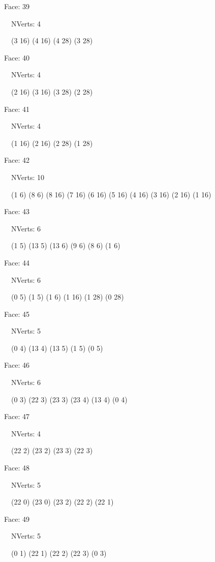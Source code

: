 \documentclass{article}
\begin{document}
{\footnotesize 

Face: 39

\   \    NVerts: 4

 \   \   (3 16) (4 16) (4 28) (3 28)}

{\footnotesize 

Face: 40

\   \    NVerts: 4

 \   \   (2 16) (3 16) (3 28) (2 28)}

{\footnotesize 

Face: 41

\   \    NVerts: 4

 \   \   (1 16) (2 16) (2 28) (1 28)}

{\footnotesize 

Face: 42

\   \    NVerts: 10

 \   \   (1 6) (8 6) (8 16) (7 16) (6 16) (5 16) (4 16) (3 16) (2 16) (1 16)}

{\footnotesize 

Face: 43

\   \    NVerts: 6

 \   \   (1 5) (13 5) (13 6) (9 6) (8 6) (1 6)}

{\footnotesize 

Face: 44

\   \    NVerts: 6

 \   \   (0 5) (1 5) (1 6) (1 16) (1 28) (0 28)}

{\footnotesize 

Face: 45

\   \    NVerts: 5

 \   \   (0 4) (13 4) (13 5) (1 5) (0 5)}

{\footnotesize 

Face: 46

\   \    NVerts: 6

 \   \   (0 3) (22 3) (23 3) (23 4) (13 4) (0 4)}

{\footnotesize 

Face: 47

\   \    NVerts: 4

 \   \   (22 2) (23 2) (23 3) (22 3)}

{\footnotesize 

Face: 48

\   \    NVerts: 5

 \   \   (22 0) (23 0) (23 2) (22 2) (22 1)}

{\footnotesize 

Face: 49

\   \    NVerts: 5

 \   \   (0 1) (22 1) (22 2) (22 3) (0 3)}
\end{document}
